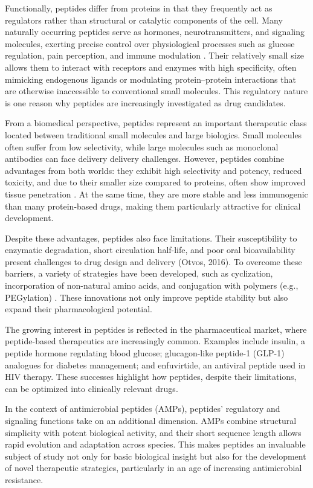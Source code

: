\documentclass[a4paper,twoside,12pt]{book}
\begin{document}
Functionally, peptides differ from proteins in that they frequently act as regulators rather than structural or catalytic components of the cell. Many naturally occurring peptides serve as hormones, neurotransmitters, and signaling molecules, exerting precise control over physiological processes such as glucose regulation, pain perception, and immune modulation \cite{bib:kaspar2013}. Their relatively small size allows them to interact with receptors and enzymes with high specificity, often mimicking endogenous ligands or modulating protein–protein interactions that are otherwise inaccessible to conventional small molecules. This regulatory nature is one reason why peptides are increasingly investigated as drug candidates.

From a biomedical perspective, peptides represent an important therapeutic class located between traditional small molecules and large biologics. Small molecules often suffer from low selectivity, while large molecules such as monoclonal antibodies can face delivery delivery challenges. However, peptides combine advantages from both worlds: they exhibit high selectivity and potency, reduced toxicity, and due to their smaller size compared to proteins, often show improved tissue penetration \cite{bib:lauj2018}. At the same time, they are more stable and less immunogenic than many protein-based drugs, making them particularly attractive for clinical development.

Despite these advantages, peptides also face limitations. Their susceptibility to enzymatic degradation, short circulation half-life, and poor oral bioavailability present challenges to drug design and delivery (Otvos, 2016). To overcome these barriers, a variety of strategies have been developed, such as cyclization, incorporation of non-natural amino acids, and conjugation with polymers (e.g., PEGylation) \cite{bib:kaspar2013}. These innovations not only improve peptide stability but also expand their pharmacological potential.

The growing interest in peptides is reflected in the pharmaceutical market, where peptide-based therapeutics are increasingly common. Examples include insulin, a peptide hormone regulating blood glucose; glucagon-like peptide-1 (GLP-1) analogues for diabetes management; and enfuvirtide, an antiviral peptide used in HIV therapy. These successes highlight how peptides, despite their limitations, can be optimized into clinically relevant drugs.

In the context of antimicrobial peptides (AMPs), peptides’ regulatory and signaling functions take on an additional dimension. AMPs combine structural simplicity with potent biological activity, and their short sequence length allows rapid evolution and adaptation across species. This makes peptides an invaluable subject of study not only for basic biological insight but also for the development of novel therapeutic strategies, particularly in an age of increasing antimicrobial resistance.
\end{document}
